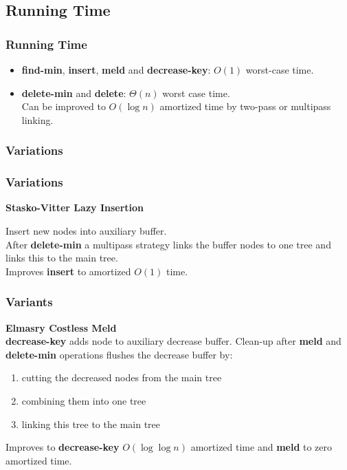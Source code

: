 \documentclass{beamer}
\begin{document}
\begin{frame}
\subsection{Running Time}
\frametitle{Running Time}

\begin{itemize}
\item \textbf{find-min}, \textbf{insert}, \textbf{meld} and \textbf{decrease-key}:
  $O(1)$ worst-case time.
\item \textbf{delete-min} and \textbf{delete}: $\Theta(n)$ worst case
  time.\\ Can be improved to $O(\log n)$ amortized time by two-pass or multipass linking.
\end{itemize}

\end{frame}

\begin{frame}
\frametitle{Variations}
\frametitle{Variations}

\textbf{Stasko-Vitter Lazy Insertion}

Insert new nodes into auxiliary buffer. \\
After \textbf{delete-min} a multipass strategy links the buffer
nodes to one tree and links this to the main tree.\\

Improves \textbf{insert} to amortized $O(1)$ time.

\end{frame}

\begin{frame}
\frametitle{Variants}

\textbf{Elmasry Costless Meld}\\

\textbf{decrease-key} adds node to auxiliary decrease buffer.
Clean-up after \textbf{meld} and \textbf{delete-min} operations
flushes the decrease buffer by:
\begin{enumerate}
\item cutting the decreased nodes from the main tree
\item combining them into one tree
\item linking this tree to the main tree
\end{enumerate}

Improves to \textbf{decrease-key} $O(\log \log n)$ amortized time and \textbf{meld}
to zero amortized time.

\end{frame}
\end{document}
